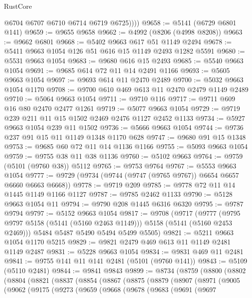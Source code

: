 \begin{lexlean}{RustCore}
\begin{coremodule}
            @6704
            @6707
            @6710
            @6714
            @6719
            @6725))))
@9658 := @5141 (@6729 @6801 @141)
@9659 := @9655 @9658
@9662 := @4992 (@8206 (@4998 @8208))
@9663 := @9662 @6801
@9668 := @5402 @9663 @617 @51 @1149 @2494
@9678 := @5411 @9663 @1054 @126 @51 @616 @15 @1149 @2493 @1282 @5591
@9680 := @5531 @9663 @1054
@9683 := @9680 @616 @15 @2493
@9685 := @5540 @9663 @1054
@9691 := @9685 @614 @72 @11 @14 @2491 @1166
@9693 := @5605 @9663 @1054
@9697 := @9693 @614 @11 @2470 @2489
@9700 := @5032 @9663 @1054 @1170
@9708 := @9700 @610 @469 @613 @11 @2470 @2479 @1149 @2489
@9710 := @5064 @9663 @1054
@9711 := @9710 @116
@9717 := @9711 @609 @16 @80 @2470 @2477 @1261
@9719 := @5077 @9663 @1054
@9729 := @9719 @239 @211 @11 @15 @1502 @2469 @2476 @1127 @2452 @1133
@9734 := @5927 @9663 @1054 @239 @11 @1502
@9736 := @5666 @9663 @1054
@9744 := @9736 @237 @91 @15 @11 @1149 @1348 @1170 @628
@9747 := @9680 @91 @15 @1348
@9753 := @9685 @60 @72 @11 @14 @1136 @1166
@9755 := @5093 @9663 @1054
@9759 := @9755 @38 @11 @38 @1136
@9760 := @5102 @9663
@9764 := @9759 (@5101 (@9760 @38)) @5112
@9765 := @9753 @9764
@9767 := @5553 @9663 @1054
@9777 := @9729 (@9734 (@9744 (@9747 (@9765 @9767)) @6654 @6657 @6660 @6663 @6668))
@9778 := @9719 @209
@9785 := @9778 @72 @11 @14 @1445 @1149 @1166 @1127
@9787 := @9785 @2462 @1133
@9790 := @5128 @9663 @1054 @11
@9794 := @9790 @208 @1445 @6316 @6320
@9795 := @9787 @9794
@9797 := @5152 @9663 @1054
@9817 := @9708
    (@9717
      (@9777 (@9795 @9797 @5158 (@5141 (@5160 @2463 @1149))) @5158 (@5141 (@5160 @2453 @2469)))
      @5484
      @5487
      @5490
      @5494
      @5499
      @5505)
@9821 := @5211 @9663 @1054 @1170 @5215
@9829 := @9821 @2479 @469 @613 @11 @1149 @2481 @1149 @2487
@9831 := @5228 @9663 @1054
@9834 := @9831 @469 @11 @2481
@9841 := @9755 @141 @11 @141 @2481 (@5101 (@9760 @141))
@9843 := @5109 (@5110 @2481)
@9844 := @9841 @9843
@9899 := @8734
    (@8759
      (@8800
        (@8802
          (@8804
            (@8821
              (@8837
                (@8854
                  (@8867
                    (@8875
                      (@8879
                        (@8907
                          (@8971
                            (@9005
                              (@9062
                                (@9175
                                  (@9273
                                    (@9659
                                      (@9668
                                        (@9678
                                          (@9683
                                            (@9691
                                              (@9697

\end{coremodule}
\end{lexlean}
